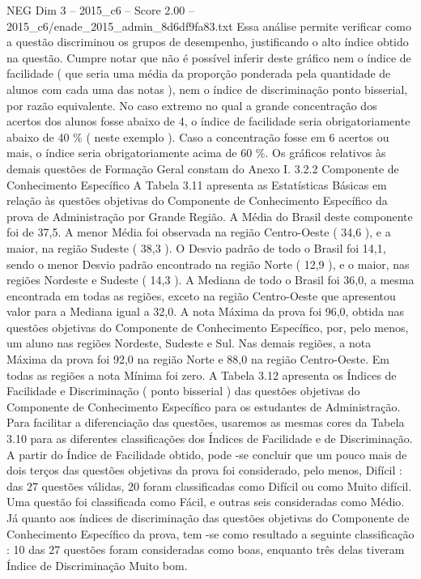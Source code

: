 \begin{textsample}{NEG Dim 3 – 2015\_c6 – Score 2.00 – 2015\_c6/enade\_2015\_admin\_8d6df9fa83.txt}
Essa análise permite verificar como a questão discriminou os grupos de desempenho, justificando o alto índice obtido na questão.
Cumpre notar que não é possível inferir deste gráfico nem o índice de facilidade ( que seria uma média da proporção ponderada pela quantidade de alunos com cada uma das notas ), nem o índice de discriminação ponto bisserial, por razão equivalente.
No caso extremo no qual a grande concentração dos acertos dos alunos fosse abaixo de 4, o índice de facilidade seria obrigatoriamente abaixo de 40 \% ( neste exemplo ).
Caso a concentração fosse em 6 acertos ou mais, o índice seria obrigatoriamente acima de 60 \%.
Os gráficos relativos às demais questões de Formação Geral constam do Anexo I. 3.2.2 Componente de Conhecimento Específico A Tabela 3.11 apresenta as Estatísticas Básicas em relação às questões objetivas do Componente de Conhecimento Específico da prova de Administração por Grande Região.
A Média do Brasil deste componente foi de 37,5.
A menor Média foi observada na região Centro-Oeste ( 34,6 ), e a maior, na região Sudeste ( 38,3 ).
O Desvio padrão de todo o Brasil foi 14,1, sendo o menor Desvio padrão encontrado na região Norte ( 12,9 ), e o maior, nas regiões Nordeste e Sudeste ( 14,3 ).
A Mediana de todo o Brasil foi 36,0, a mesma encontrada em todas as regiões, exceto na região Centro-Oeste que apresentou valor para a Mediana igual a 32,0.
A nota Máxima da prova foi 96,0, obtida nas questões objetivas do Componente de Conhecimento Específico, por, pelo menos, um aluno nas regiões Nordeste, Sudeste e Sul.
Nas demais regiões, a nota Máxima da prova foi 92,0 na região Norte e 88,0 na região Centro-Oeste.
Em todas as regiões a nota Mínima foi zero.
A Tabela 3.12 apresenta os Índices de Facilidade e Discriminação ( ponto bisserial ) das questões objetivas do Componente de Conhecimento Específico para os estudantes de Administração.
Para facilitar a diferenciação das questões, usaremos as mesmas cores da Tabela 3.10 para as diferentes classificações dos Índices de Facilidade e de Discriminação.
A partir do Índice de Facilidade obtido, pode -se concluir que um pouco mais de dois terços das questões objetivas da prova foi considerado, pelo menos, Difícil : das 27 questões válidas, 20 foram classificadas como Difícil ou como Muito difícil.
Uma questão foi classificada como Fácil, e outras seis consideradas como Médio.
Já quanto aos índices de discriminação das questões objetivas do Componente de Conhecimento Específico da prova, tem -se como resultado a seguinte classificação : 10 das 27 questões foram consideradas como boas, enquanto três delas tiveram Índice de Discriminação Muito bom.

\end{textsample}
